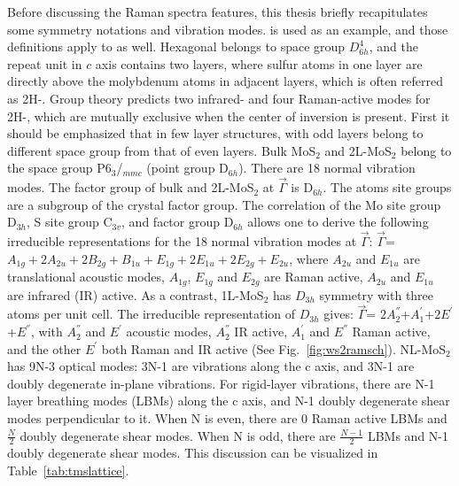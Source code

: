 Before discussing the Raman spectra features, this thesis briefly recapitulates some symmetry notations and vibration modes.  is used as an example, and those definitions apply to  as well. Hexagonal  belongs to space group $D_{6h}^4$, and the repeat unit in $c$ axis contains two layers, where sulfur atoms in one layer are directly above the molybdenum atoms in adjacent layers, which is often referred as 2H-. Group theory predicts two infrared- and four Raman-active modes for 2H-, which are mutually exclusive when the center of inversion is present. First it should be emphasized that in few layer structures,  with odd layers belong to different space group from that of even layers. Bulk MoS$_2$ and 2L-MoS$_2$ belong to the space group P6$_3$/$_{mmc}$ (point group D$_{6h}$). There are 18 normal vibration modes. The factor group of bulk and 2L-MoS$_2$ at $\vec{\Gamma}$ is D$_{6h}$. The atoms site groups are a subgroup of the crystal factor group. The correlation of the Mo site group D$_{3h}$, S site group C$_{3v}$, and factor group D$_{6h}$ allows one to derive the following irreducible representations for the 18 normal vibration modes at $\vec{\Gamma}$: $\vec{\Gamma}$= $A_{1g}+2A_{2u}+2B_{2g}+B_{1u}+E_{1g}+2E_{1u}+2E_{2g}+E_{2u}$, where $A_{2u}$ and $E_{1u}$ are translational acoustic modes, $A_{1g}$, $E_{1g}$ and $E_{2g}$ are Raman active, $A_{2u}$ and $E_{1u}$ are infrared (IR) active. As a contrast, 1L-MoS$_2$ has $D_{3h}$ symmetry with three atoms per unit cell. The irreducible representation of $D_{3h}$ gives: $\vec{\Gamma}$= $2A_2^{''}$+$A_1^{'}$+$2E^{'}$+$E^{''}$, with $A_2^{''}$ and $E^{'}$ acoustic modes, $A_2^{''}$ IR active, $A_1^{'}$ and $E^{''}$ Raman active, and the other $E^{'}$ both Raman and IR active (See Fig.~\ref{fig:ws2ramsch}). NL-MoS$_2$ has 9N-3 optical modes: 3N-1 are vibrations along the c axis, and 3N-1 are doubly degenerate in-plane vibrations. For rigid-layer vibrations, there are N-1 layer breathing modes (LBMs) along the c axis, and N-1 doubly degenerate shear modes perpendicular to it. When N is even, there are 0 Raman active LBMs and $\frac{N}{2}$ doubly degenerate shear modes. When N is odd, there are $\frac{N-1}{2}$ LBMs and N-1 doubly degenerate shear modes.\cite{Wieting1971,Zhang2013e} This discussion can be visualized in Table~\ref{tab:tmslattice}.

